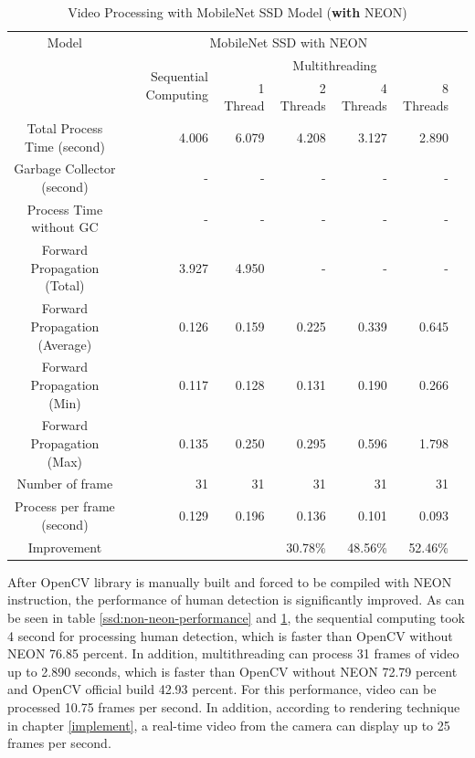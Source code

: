             \begin{table}[!htp]\centering
                \scriptsize
                \begin{tabular}{lrrrrrrr}\toprule
                    \multicolumn{2}{c}{Model} &\multicolumn{5}{c}{MobileNet SSD with NEON} \\\cmidrule{1-7}
                    \multicolumn{2}{c}{\multirow{2}{*}{}} &\multirow{2}{*}{Sequential Computing} &\multicolumn{4}{c}{Multithreading} \\\cmidrule{4-7}
                    & & &1 Thread &2 Threads &4 Threads &8 Threads \\\midrule
                    \multicolumn{2}{c}{Total Process Time (second)} &4.006 &6.079 &4.208 &3.127 &2.890 \\
                    \multicolumn{2}{c}{Garbage Collector (second)} &- &- &- &- &- \\
                    \multicolumn{2}{c}{Process Time without GC} &- &- &- &- &- \\
                    \multicolumn{2}{c}{Forward Propagation (Total)} &3.927 &4.950 &- &- &- \\
                    \multicolumn{2}{c}{Forward Propagation (Average)} &0.126 &0.159 &0.225 &0.339 &0.645 \\
                    \multicolumn{2}{c}{Forward Propagation (Min)} &0.117 &0.128 &0.131 &0.190 &0.266 \\
                    \multicolumn{2}{c}{Forward Propagation (Max)} &0.135 &0.250 &0.295 &0.596 &1.798 \\
                    \multicolumn{2}{c}{Number of frame} &31 &31 &31 &31 &31 \\
                    \multicolumn{2}{c}{Process per frame (second)} &0.129 &0.196 &0.136 &0.101 &0.093 \\
                    \multicolumn{2}{c}{Improvement} & & &30.78\% &48.56\% &52.46\% \\
                    \bottomrule
                \end{tabular}

                \caption{Video Processing with MobileNet SSD Model ({\bf with} NEON)}\label{ssd:neon-performance}
            \end{table}

            After OpenCV library is manually built and forced to be compiled with NEON instruction,
            the performance of human detection is significantly improved.
            As can be seen in table \ref{ssd:non-neon-performance} and \ref{ssd:neon-performance},
            the sequential computing took 4 second for processing human detection,
            which is faster than OpenCV without NEON 76.85 percent.
            In addition, multithreading can process 31 frames of video up to 2.890 seconds,
            which is faster than OpenCV without NEON 72.79 percent and OpenCV official build 42.93 percent.
            For this performance, video can be processed 10.75 frames per second.
            In addition, according to rendering technique in chapter \ref{implement},
            a real-time video from the camera can display up to 25 frames per second.

